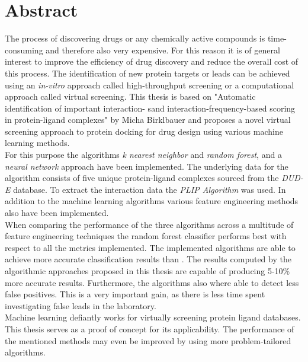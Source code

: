 \chapter{Abstract}

The process of discovering drugs or any chemically active compounds is time-consuming and therefore also very expensive.
For this reason it is of general interest to improve the efficiency of drug discovery and reduce the overall cost of this process.
The identification of new protein targets or leads can be achieved using an \textit{in-vitro} approach called high-throughput screening or a computational 
approach called virtual screening. 
This thesis is based on "Automatic identification of important interaction-
sand interaction-frequency-based scoring in protein-ligand complexes" by Micha Birklbauer\cite[]{Birklbauer2021} and
proposes a novel virtual screening approach to protein docking for drug design using various machine learning methods.
\\
For this purpose the algorithms \textit{k nearest neighbor} and \textit{random forest}, and a \textit{neural network} approach have been implemented.
The underlying data for the algorithm consists of five unique protein-ligand complexes sourced from the \textit{DUD-E} database\cite[]{Mysinger2012}.
To extract the interaction data the \textit{PLIP Algorithm} \cite[]{Salentin2015} was used.
In addition to the machine learning algorithms various feature engineering methods also have been implemented.
\\
When comparing the performance of the three algorithms across a multitude of feature engineering techniques the random forest classifier performs 
best with respect to all the metrics implemented.
The implemented algorithms are able to achieve more accurate classification results than \cite[]{Birklbauer2021}. The results computed by the algorithmic approaches proposed in this thesis
are capable of producing 5-10\% more accurate results. Furthermore, the algorithms also where able to detect less false positives. This is a very important gain, as there is less time spent 
investigating false leads in the laboratory.
\\
Machine learning defiantly works for virtually screening protein ligand databases. This thesis serves as a proof of concept for its applicability.
The performance of the mentioned methods may even be improved by using more problem-tailored algorithms.